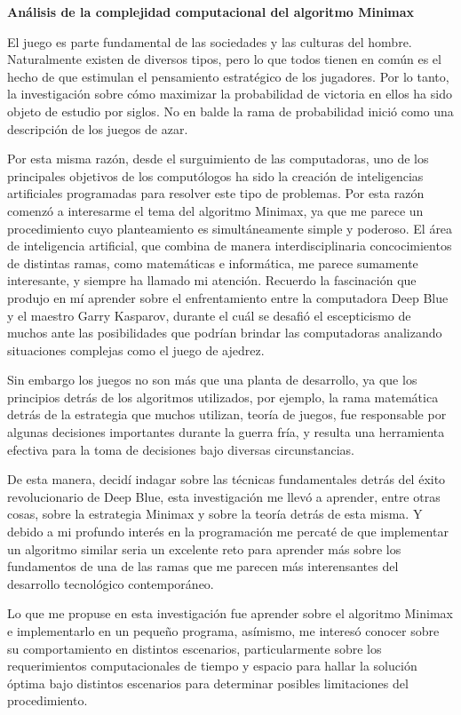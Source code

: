 \Large{\textbf{Análisis de la complejidad computacional del algoritmo Minimax}}

\normalsize
El juego es parte fundamental de las sociedades y las culturas del hombre.
Naturalmente existen de diversos tipos, pero lo que todos tienen en común es el
hecho de que estimulan el pensamiento estratégico de  los jugadores. Por lo
tanto, la investigación sobre cómo maximizar la probabilidad de victoria en
ellos ha sido objeto de estudio por siglos. No en balde la rama de probabilidad
inició como una descripción de los juegos de azar. 

Por esta misma razón, desde el surguimiento de las computadoras, uno de los
principales objetivos de los computólogos ha sido la creación de inteligencias
artificiales programadas para resolver este tipo de problemas. Por esta razón
comenzó a interesarme el tema del algoritmo Minimax, ya que me parece un
procedimiento cuyo planteamiento es simultáneamente simple y poderoso. El área
de inteligencia artificial, que combina de manera interdisciplinaria
concocimientos de distintas ramas, como matemáticas e informática, me parece
sumamente interesante, y siempre ha llamado mi atención. Recuerdo la fascinación
que produjo en mí aprender sobre el enfrentamiento entre la computadora Deep
Blue y el maestro Garry Kasparov, durante el cuál se desafió el escepticismo de
muchos ante las posibilidades que podrían brindar las computadoras analizando
situaciones complejas como el juego de ajedrez. 

Sin embargo los juegos no son más que una planta de desarrollo, ya que los
principios detrás de los algoritmos utilizados, por ejemplo, la rama
matemática detrás de la estrategia que muchos utilizan, teoría de juegos, fue responsable por algunas
decisiones importantes durante la guerra fría, y resulta una herramienta
efectiva para la toma de decisiones bajo diversas circunstancias. 

De esta manera, decidí indagar sobre las técnicas fundamentales detrás del éxito
revolucionario de Deep Blue, esta investigación me llevó a aprender, entre otras
cosas, sobre la
estrategia Minimax y sobre la teoría detrás de esta misma. Y debido a  mi profundo interés en
la programación me percaté de que implementar un algoritmo similar seria un
excelente reto para aprender más sobre los fundamentos de una de las ramas que
me parecen más interensantes del desarrollo tecnológico contemporáneo. 

Lo que me propuse en esta investigación fue aprender sobre el algoritmo Minimax
e implementarlo en un pequeño programa, asímismo, me interesó conocer
sobre su comportamiento en distintos escenarios, particularmente sobre los
requerimientos computacionales de tiempo y espacio para hallar la solución
óptima bajo distintos escenarios para determinar posibles limitaciones del procedimiento. 

